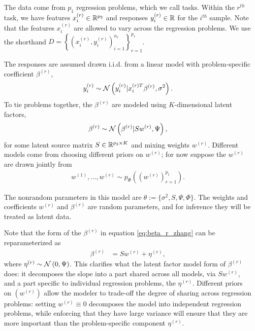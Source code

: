 \documentclass[14pt]{extarticle}
\begin{document}
The data come from $p_{1}$ regression problems, which we call tasks. Within the
$r^{th}$ task, we have features $x_{i}^{(r)} \in \mathbb{R}^{p_{2}}$ and responses
$y_{i}^{(r)} \in \mathbb{R}$ for the $i^{th}$ sample. Note that the features
$x_{i}^{(r)}$ are allowed to vary across the regression problems. We use the
shorthand $D = \left\{\left(x_{i}^{(r)}, y_i^{(r)}\right)_{i =
  1}^{n_{r}}\right\}_{r = 1}^{p_{1}}$.

The responses are assumed drawn i.i.d. from a linear model with problem-specific
coefficient $\beta^{(r)}$,
\begin{align*}
  y_{i}^{(r)} \sim \mathcal{N}\left(y_i^{(r)} \vert x_{i}^{(r) T}\beta^{(r)}, \sigma^{2}\right).
\end{align*}
To tie problems together, the $\beta^{(r)}$ are modeled using $K$-dimensional
latent factors,
\begin{align}
  \beta^{(r)} \sim \mathcal{N}\left(\beta^{(r)} \vert S w^{(r)}, \Psi\right), \label{eq:beta_r_zhang}
\end{align}
for some latent source matrix $S \in \mathbb{R}^{p_{2} \times K}$ and mixing weights
$w^{(r)}$. Different models come from choosing different priors on $w^{(r)}$;
for now suppose the $w^{(r)}$ are drawn jointly from
\begin{align*}
w^{(1)}, \dots, w^{(r)} \sim  p_{\Phi}\left(\left(w^{\left(r\right)}\right)_{r = 1}^{p_{1}}\right).
\end{align*}

The nonrandom parameters in this model are $\theta := \{\sigma^{2}, S, \Psi,
\Phi\}$. The weights and coefficients $w^{(r)}$ and $\beta^{(r)}$ are random
parameters, and for inference they will be treated as latent data.

Note that the form of the $\beta^{(r)}$ in equation \ref{eq:beta_r_zhang} can
be reparameterized as
\begin{align*}
\beta^{(r)} &= Sw^{(r)} + \eta^{(r)},
\end{align*}
where $\eta^{(r)} \sim \mathcal{N}\left(0, \Psi\right)$. This clarifies what the latent
factor model form of $\beta^{(r)}$ does: it decomposes the slope into a part
shared across all models, via $Sw^{(r)}$, and a part specific to individual
regression problems, the $\eta^{(r)}$. Different priors on
$\left(w^{(r)}\right)$ allow the modeler to trade-off the degree of sharing
across regression problems: setting $w^{(r)} \equiv 0$ decomposes the model into
independent regression problems, while enforcing that they have large variance
will ensure that they are more important than the problem-specific component
$\eta^{(r)}$.
\end{document}
